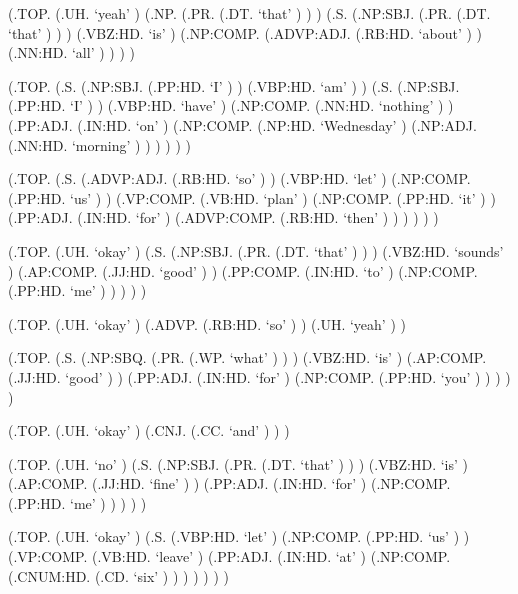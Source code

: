 \documentclass[10pt]{article}
\begin{document}
\begin{parsetree}  (.TOP. (.UH. `yeah' ) (.NP. (.PR. (.DT. `that' ) ) ) (.S. (.NP:SBJ. (.PR. (.DT. `that' ) ) ) (.VBZ:HD. `is' ) (.NP:COMP. (.ADVP:ADJ. (.RB:HD. `about' ) ) (.NN:HD. `all' ) ) ) ) \end{parsetree}

\begin{parsetree}  (.TOP. (.S. (.NP:SBJ. (.PP:HD. `I' ) ) (.VBP:HD. `am' ) ) (.S. (.NP:SBJ. (.PP:HD. `I' ) ) (.VBP:HD. `have' ) (.NP:COMP. (.NN:HD. `nothing' ) ) (.PP:ADJ. (.IN:HD. `on' ) (.NP:COMP. (.NP:HD. `Wednesday' ) (.NP:ADJ. (.NN:HD. `morning' ) ) ) ) ) ) \end{parsetree}

\begin{parsetree}  (.TOP. (.S. (.ADVP:ADJ. (.RB:HD. `so' ) ) (.VBP:HD. `let' ) (.NP:COMP. (.PP:HD. `us' ) ) (.VP:COMP. (.VB:HD. `plan' ) (.NP:COMP. (.PP:HD. `it' ) ) (.PP:ADJ. (.IN:HD. `for' ) (.ADVP:COMP. (.RB:HD. `then' ) ) ) ) ) ) \end{parsetree}

\begin{parsetree}  (.TOP. (.UH. `okay' ) (.S. (.NP:SBJ. (.PR. (.DT. `that' ) ) ) (.VBZ:HD. `sounds' ) (.AP:COMP. (.JJ:HD. `good' ) ) (.PP:COMP. (.IN:HD. `to' ) (.NP:COMP. (.PP:HD. `me' ) ) ) ) ) \end{parsetree}

\begin{parsetree}  (.TOP. (.UH. `okay' ) (.ADVP. (.RB:HD. `so' ) ) (.UH. `yeah' ) ) \end{parsetree}

\begin{parsetree}  (.TOP. (.S. (.NP:SBQ. (.PR. (.WP. `what' ) ) ) (.VBZ:HD. `is' ) (.AP:COMP. (.JJ:HD. `good' ) ) (.PP:ADJ. (.IN:HD. `for' ) (.NP:COMP. (.PP:HD. `you' ) ) ) ) ) \end{parsetree}

\begin{parsetree}  (.TOP. (.UH. `okay' ) (.CNJ. (.CC. `and' ) ) ) \end{parsetree}

\begin{parsetree}  (.TOP. (.UH. `no' ) (.S. (.NP:SBJ. (.PR. (.DT. `that' ) ) ) (.VBZ:HD. `is' ) (.AP:COMP. (.JJ:HD. `fine' ) ) (.PP:ADJ. (.IN:HD. `for' ) (.NP:COMP. (.PP:HD. `me' ) ) ) ) ) \end{parsetree}

\begin{parsetree}  (.TOP. (.UH. `okay' ) (.S. (.VBP:HD. `let' ) (.NP:COMP. (.PP:HD. `us' ) ) (.VP:COMP. (.VB:HD. `leave' ) (.PP:ADJ. (.IN:HD. `at' ) (.NP:COMP. (.CNUM:HD. (.CD. `six' ) ) ) ) ) ) ) \end{parsetree}
\end{document}
